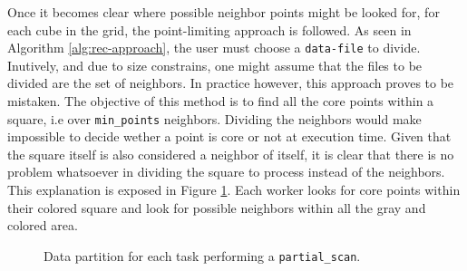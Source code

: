 \documentclass[10pt,journal,compsoc]{IEEEtran}
\let\MYoriglatexcaption\caption
\renewcommand{\caption}[2][\relax]{\MYoriglatexcaption[#2]{#2}}
\begin{document}
Once it becomes clear where possible neighbor points might be looked for, for each cube in the grid, the point-limiting approach is followed. As seen in Algorithm \ref{alg:rec-approach}, the user must choose a \texttt{data-file} to divide. Inutively, and due to size constrains, one might assume that the files to be divided are the set of neighbors. In practice however, this approach proves to be mistaken. The objective of this method is to find all the core points within a square, i.e over \texttt{min\_points} neighbors. Dividing the neighbors would make impossible to decide wether a point is core or not at execution time. Given that the square itself is also considered a neighbor of itself, it is clear that there is no problem whatsoever in dividing the square to process instead of the neighbors. This explanation is exposed in Figure \ref{fig:p-scan-division}. Each worker looks for core points within their colored square and look for possible neighbors within all the gray and colored area.

\begin{figure}[!h]
\centering
{}
\caption{Data partition for each task performing a \texttt{partial\_scan}. \label{fig:p-scan-division}}
\end{figure}
\end{document}
